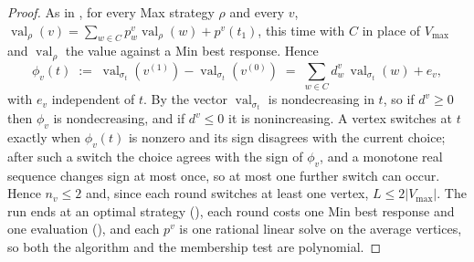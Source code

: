 \documentclass[11pt]{article}
\theoremstyle{plain}
\theoremstyle{definition}
\DeclareMathOperator{\val}{val}
\newcommand{\Vmax}{V_{\max}}
\begin{document}
\begin{proof}
As in , for every Max strategy $\rho$ and every $v$,
$\val_\rho(v)=\sum_{w\in C}p^{v}_w\val_\rho(w)+p^{v}(t_1)$, this time with $C$ in
place of $\Vmax$ and $\val_\rho$ the value against a Min best response. Hence
\[
  \phi_v(t)\;:=\;\val_{\sigma_t}(v^{(1)})-\val_{\sigma_t}(v^{(0)})
  \;=\;\sum_{w\in C}d^{v}_w\,\val_{\sigma_t}(w)+e_v ,
\]
with $e_v$ independent of $t$. By  the vector $\val_{\sigma_t}$ is
nondecreasing in $t$, so if $d^{v}\ge0$ then $\phi_v$ is nondecreasing, and if
$d^{v}\le0$ it is nonincreasing. A vertex switches at $t$ exactly when $\phi_v(t)$ is
nonzero and its sign disagrees with the current choice; after such a switch the choice
agrees with the sign of $\phi_v$, and a monotone real sequence changes sign at most
once, so at most one further switch can occur. Hence $n_v\le2$ and, since each round
switches at least one vertex, $L\le2|\Vmax|$. The run ends at an optimal strategy
(), each round costs one Min best response and one evaluation
(), and each $p^{v}$ is one rational linear solve on the
average vertices, so both the algorithm and the membership test are polynomial.
\end{proof}
\end{document}
